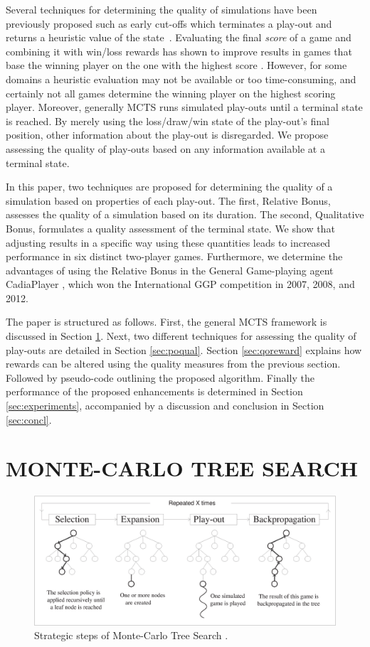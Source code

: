 \documentclass{ecai2014}
\begin{document}
Several techniques for determining the quality of simulations have been previously proposed such as early cut-offs which terminates a play-out and returns a heuristic value of the state~\cite{Winands2011}. Evaluating the final \emph{score} of a game and combining it with win/loss rewards has shown to improve results in games that base the winning player on the one with the highest score \cite{shibahara2008combining}. However, for some domains a heuristic evaluation may not be available or too time-consuming, and certainly not all games determine the winning player on the highest scoring player. Moreover, generally MCTS runs simulated play-outs until a terminal state is reached. By merely using the loss/draw/win state of the play-out's final position, other information about the play-out is disregarded. We propose assessing the quality of play-outs based on any information available at a terminal state.

In this paper, two techniques are proposed for determining the quality of a simulation based on properties of each play-out. The first, Relative Bonus, assesses the quality of a simulation based on its duration. The second, Qualitative Bonus, formulates a quality assessment of the terminal state. We show that adjusting results in a specific way using these quantities leads to increased performance in six distinct two-player games. Furthermore, we determine the advantages of using the Relative Bonus in the General Game-playing agent {\sc CadiaPlayer} \cite{bjornsson2009cadiaplayer}, which won the International GGP competition in 2007, 2008, and 2012.

The paper is structured as follows. First, the general MCTS framework is discussed in Section \ref{sec:mcts}. Next, two different techniques for assessing the quality of play-outs are detailed in Section \ref{sec:poqual}. Section \ref{sec:qoreward} explains how rewards can be altered using the quality measures from the previous section. Followed by pseudo-code outlining the proposed algorithm. Finally the performance of the proposed enhancements is determined in Section \ref{sec:experiments}, accompanied by a discussion and conclusion in Section \ref{sec:concl}.

\section{MONTE-CARLO TREE SEARCH}
\label{sec:mcts}
\begin{figure}[ht]
	\centering
	\includegraphics[width=.45\textwidth]{img/figure1.eps}
	\caption{Strategic steps of Monte-Carlo Tree Search \cite{chaslot2008progressive}.}
	\label{fig:mcts-algorithm}
\end{figure}
\end{document}
